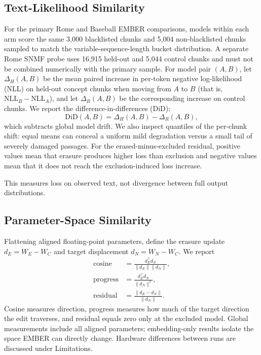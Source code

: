 \subsection{Text-Likelihood Similarity}

For the primary Rome and Baseball EMBER comparisons, models within each arm
score the same 3,000 blacklisted chunks and 5,004 non-blacklisted chunks sampled to match the
variable-sequence-length bucket distribution. A separate Rome SNMF probe uses
16,915 held-out and 5,044 control chunks and must not be combined numerically
with the primary sample. For
model pair $(A,B)$, let $\Delta_H(A,B)$ be the mean paired increase in
per-token negative log-likelihood (NLL) on held-out concept chunks when moving
from $A$ to $B$ (that is, $\mathrm{NLL}_B-\mathrm{NLL}_A$), and let
$\Delta_R(A,B)$ be the corresponding increase on control chunks. We report the
difference-in-differences (DiD):
\begin{equation}
\mathrm{DiD}(A,B)=\Delta_H(A,B)-\Delta_R(A,B),
\end{equation}
which subtracts global model drift. We also inspect quantiles of the per-chunk
shift: equal means can conceal a uniform mild degradation versus a small tail
of severely damaged passages. For the erased-minus-excluded residual, positive
values mean that erasure produces higher loss than exclusion and negative
values mean that it does not reach the exclusion-induced loss increase.

This measures loss on observed text, not divergence between full output
distributions.

\subsection{Parameter-Space Similarity}

Flattening aligned floating-point parameters, define the erasure update
$d_E=W_E-W_C$ and target displacement $d_N=W_N-W_C$. We report
\begin{align}
\mathrm{cosine} &= \frac{d_E^\top d_N}{\lVert d_E\rVert\lVert d_N\rVert},\\
\mathrm{progress} &= \frac{d_E^\top d_N}{\lVert d_N\rVert^2},\\
\mathrm{residual} &= \frac{\lVert d_E-d_N\rVert}{\lVert d_N\rVert}.
\end{align}
Cosine measures direction, progress measures how much of the target direction
the edit traverses, and residual equals zero only at the excluded model. Global
measurements include all aligned parameters; embedding-only results isolate the
space EMBER can directly change. Hardware differences between runs are
discussed under Limitations.

